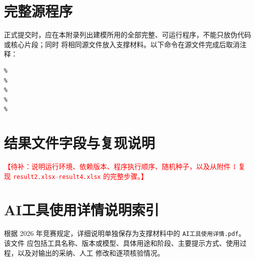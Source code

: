 \documentclass[UTF8,a4paper,zihao=-4]{ctexart}
\newcommand{\placeholder}[1]{\textcolor{red}{【待补：#1】}}
\begin{document}
\section{完整源程序}

正式提交时，应在本附录列出建模所用的全部完整、可运行程序，不能只放伪代码或核心片段；同时
将相同源文件放入支撑材料。以下命令在源文件完成后取消注释：

\begin{verbatim}
% 
% 
% 
% 
% 
\end{verbatim}

\section{结果文件字段与复现说明}

\placeholder{说明运行环境、依赖版本、程序执行顺序、随机种子，以及从附件 1 复现
\texttt{result2.xlsx}--\texttt{result4.xlsx} 的完整步骤。}

\section{AI工具使用详情说明索引}

根据 2026 年竞赛规定，详细说明单独保存为支撑材料中的 \texttt{AI工具使用详情.pdf}。该文件
应包括工具名称、版本或模型、具体用途和阶段、主要提示方式、使用过程，以及对输出的采纳、人工
修改和逐项核验情况。
\end{document}
